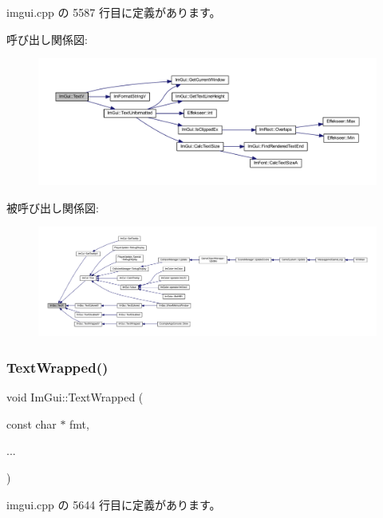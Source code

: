  imgui.\+cpp の 5587 行目に定義があります。

呼び出し関係図\+:\nopagebreak
\begin{figure}[H]
\begin{center}
\leavevmode
\includegraphics[width=350pt]{namespace_im_gui_a10a0d6362178c2f743092f21e1b6cd20_cgraph}
\end{center}
\end{figure}
被呼び出し関係図\+:
\nopagebreak
\begin{figure}[H]
\begin{center}
\leavevmode
\includegraphics[width=350pt]{namespace_im_gui_a10a0d6362178c2f743092f21e1b6cd20_icgraph}
\end{center}
\end{figure}
\mbox{\label{namespace_im_gui_ad57bb15c599e73b2ccc7c0f7de6e5823}} 
\subsubsection{\texorpdfstring{Text\+Wrapped()}{TextWrapped()}}
{\footnotesize\ttfamily void Im\+Gui\+::\+Text\+Wrapped (\begin{DoxyParamCaption}\item[{const char $\ast$}]{fmt,  }\item[{}]{... }\end{DoxyParamCaption})}



 imgui.\+cpp の 5644 行目に定義があります。

